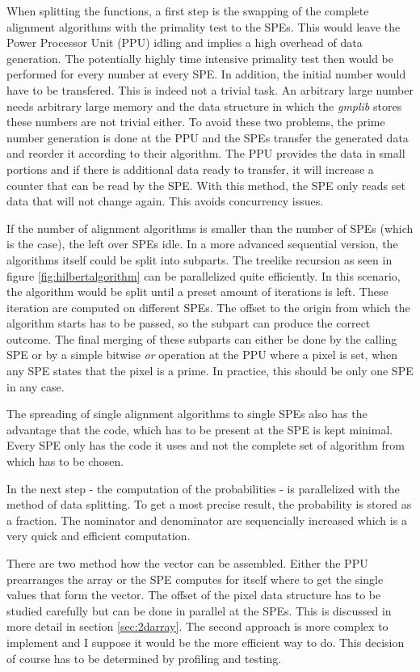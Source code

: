 When splitting the functions, a first step is the swapping of the complete alignment algorithms with the primality test to the SPEs. This would leave the Power Processor Unit (PPU) idling and implies a high overhead of data generation. The potentially highly time intensive primality test then would be performed for every number at every SPE. In addition, the initial number would have to be transfered. This is indeed not a trivial task. An arbitrary large number needs arbitrary large memory and the data structure in which the \emph{gmplib} stores these numbers are not trivial either.
To avoid these two problems, the prime number generation is done at the PPU and the SPEs transfer the generated data and reorder it according to their algorithm.
The PPU provides the data in small portions and if there is additional data ready to transfer, it will increase a counter that can be read by the SPE. With this method, the SPE only reads set data that will not change again. This avoids concurrency issues.

If the number of alignment algorithms is smaller than the number of SPEs (which is the case), the left over SPEs idle. In a more advanced sequential version, the algorithms itself could be split into subparts. The treelike  recursion as seen in figure \ref{fig:hilbertalgorithm} can be parallelized quite efficiently. In this scenario, the algorithm would be split until a preset amount of iterations is left. These iteration are computed on different SPEs. The offset to the origin from which the algorithm starts has to be passed, so the subpart can produce the correct outcome. The final merging of these subparts can either be done by the calling SPE or by a simple bitwise \emph{or} operation at the PPU where a pixel is set, when any SPE states that the pixel is a prime. In practice, this should be only one SPE in any case.

The spreading of single alignment algorithms to single SPEs also has the advantage that the code, which has to be present at the SPE is kept minimal. Every SPE only has the code it uses and not the complete set of algorithm from which has to be chosen.

In the next step - the computation of the probabilities - is parallelized with the method of data splitting. To get a most precise result, the probability is stored as a fraction. The nominator and denominator are sequencially increased which is a very quick and efficient computation.

There are two method how the vector can be assembled. Either the PPU prearranges the array or the SPE computes for itself where to get the single values that form the vector.  The offset of the pixel data structure has to be studied carefully but can be done in parallel at the SPEs. This is discussed in more detail in section \ref{sec:2darray}. The second approach is more complex to implement and I suppose it would be the more efficient way to do. This decision of course has to be determined by profiling and testing.


